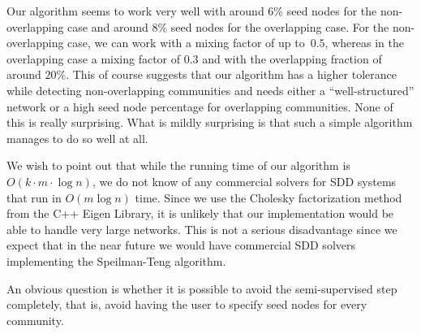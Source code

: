 Our algorithm seems to work very well with around 6$\%$ seed nodes for the 
non-overlapping case and around 8$\%$ seed nodes for the overlapping case. 
For the non-overlapping case, we can work with a mixing factor of up 
to~$0.5$, whereas in the overlapping case a mixing factor of $0.3$ 
and with the overlapping fraction of around $20\%$. This of course 
suggests that our algorithm has a higher tolerance while detecting 
non-overlapping communities and needs either a ``well-structured''
network or a high seed node percentage for overlapping communities. 
None of this is really surprising. What is mildly surprising is that such 
a simple algorithm manages to do so well at all.

We wish to point out that while the running time of our algorithm is 
$O(k \cdot m \cdot \log n)$, we do not know of any commercial solvers 
for SDD systems that run in $O(m \log n)$ time. Since we use the Cholesky 
factorization method from the C++ Eigen Library, it is unlikely that our 
implementation would be able to handle very large networks. This is 
not a serious disadvantage since we expect that in the near future 
we would have commercial SDD solvers implementing the Speilman-Teng 
algorithm. 

An obvious question is whether it is possible to avoid the semi-supervised 
step completely, that is, avoid having the user to specify seed nodes 
for every community. 

